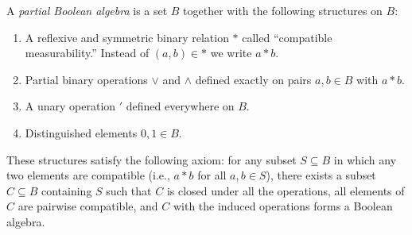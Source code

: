 A \emph{partial Boolean algebra} is a set $B$ together with the following structures on $B$:

\begin{enumerate}
\item[(a)] A reflexive and symmetric binary relation $*$ called ``compatible measurability.'' Instead of $(a, b) \in *$ we write $a * b$.
\item[(b)] Partial binary operations $\vee$ and $\wedge$ defined exactly on pairs $a, b \in B$ with $a * b$.
\item[(c)] A unary operation $'$ defined everywhere on $B$.
\item[(d)] Distinguished elements $0, 1 \in B$.
\end{enumerate}

These structures satisfy the following axiom: for any subset $S \subseteq B$ in which any two elements are compatible (i.e., $a * b$ for all $a, b \in S$), there exists a subset $C \subseteq B$ containing $S$ such that $C$ is closed under all the operations, all elements of $C$ are pairwise compatible, and $C$ with the induced operations forms a Boolean algebra.
